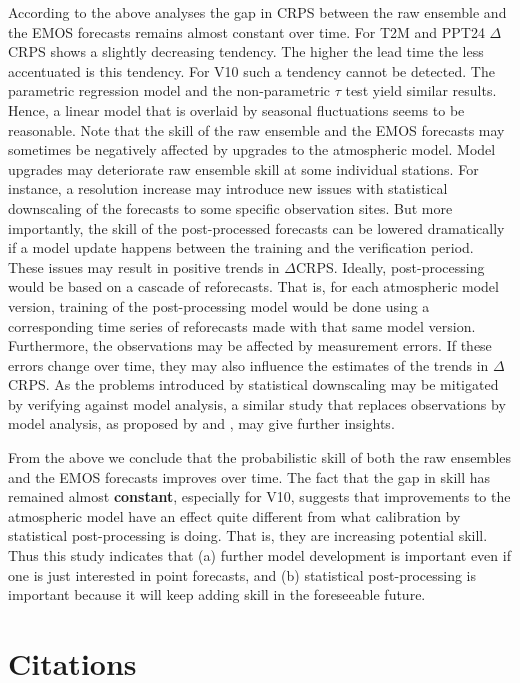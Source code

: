 According to the above analyses the gap in CRPS between the raw
ensemble and the EMOS forecasts remains almost constant over time. For
T2M and PPT24 $\Delta$CRPS shows a slightly decreasing tendency. The
higher the lead time the less accentuated is this tendency. For V10
such a tendency cannot be detected. The parametric regression model
and the non-parametric $\tau$ test yield similar results. Hence, a
linear model that is overlaid by seasonal fluctuations seems to be
reasonable. Note that the skill of the raw ensemble and the EMOS
forecasts may sometimes be negatively affected by upgrades to the
atmospheric model. Model upgrades may deteriorate raw ensemble skill
at some individual stations. For instance, a resolution increase may
introduce new issues with statistical downscaling of the forecasts to
some specific observation sites. But more importantly, the skill of
the post-pro\-cessed forecasts can be lowered dramatically if a model
update happens between the training and the verification period. These
issues may result in positive trends in $\Delta$CRPS. Ideally,
post-processing would be based on a cascade of reforecasts. That is,
for each atmospheric model version, training of the post-processing
model would be done using a corresponding time series of reforecasts
made with that same model version. Furthermore, the observations may
be affected by measurement errors. If these errors change over time,
they may also influence the estimates of the trends in $\Delta$CRPS.
As the problems introduced by statistical downscaling may be mitigated
by verifying against model analysis, a similar study that replaces
observations by model analysis, as proposed by \citet{Ghel00} and
\citet{Papp09}, may give further insights.

From the above we conclude that the probabilistic skill of both the
raw ensembles and the EMOS forecasts improves over time. The fact that
the gap in skill has remained almost \textbf{constant}, especially for
V10, suggests that improvements to the atmospheric model have an
effect quite different from what calibration by statistical
post-processing is doing. That is, they are increasing potential
skill. Thus this study indicates that (a) further model development is
important even if one is just interested in point forecasts, and (b)
statistical post-processing is important because it will keep adding
skill in the foreseeable future.

\section*{Citations}

